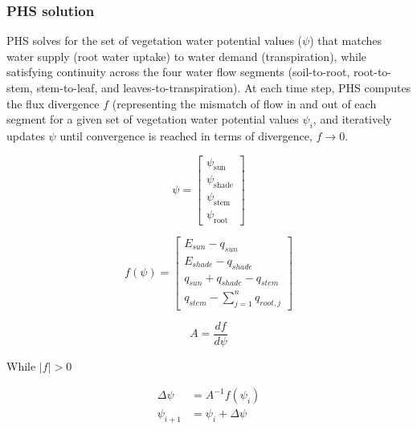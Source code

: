 \documentclass[draft,linenumbers]{agujournal}
\begin{document}
    \subsubsection{PHS solution}
    \label{sect:solution}
    
    PHS solves for the set of vegetation water potential values ($\psi$) that matches water supply (root water uptake) to water demand (transpiration), while satisfying continuity across the four water flow segments (soil-to-root, root-to-stem, stem-to-leaf, and leaves-to-transpiration). At each time step, PHS computes the flux divergence $f$ (representing the mismatch of flow in and out of each segment for a given set of vegetation water potential values $\psi_i$, and iteratively updates $\psi$ until convergence is reached in terms of divergence, $f\to0$.
    
    \begin{linenomath*}
    \begin{equation} 
    \psi = \left[
    \begin{array}{c}
    \psi_{\text{sun}} \\ 
    \psi_{\text{shade}} \\ 
    \psi_{\text{stem}} \\ 
    \psi_{\text{root}}            
    \end{array} \right]
    \end{equation}
    \end{linenomath*}
    
    \begin{linenomath*}
    \begin{equation}
    f\left(\psi\right) = \left[ 
    \begin{array}{c}
    E_{sun}-q_{sun}\\
    E_{shade}-q_{shade}\\
    q_{sun}+q_{shade}-q_{stem}\\
    q_{stem}-\sum_{j=1}^n{q_{root,j}}
    \end{array} \right]
    \end{equation}
    \end{linenomath*}
    
    \begin{linenomath*}
    \begin{equation}
    A = \dfrac{df}{d\psi}
    \end{equation}
    \end{linenomath*}    
    
    While $\left|f\right|>0$
    \begin{linenomath*}
    \begin{equation} \begin{aligned}
    \label{eq:iter}
    \Delta\psi &=A^{-1}f\left(\psi_i\right) \\
    \psi_{i+1}  &= \psi_i + \Delta\psi
    \end{aligned} \end{equation}
    \end{linenomath*}    
    
\end{document}
